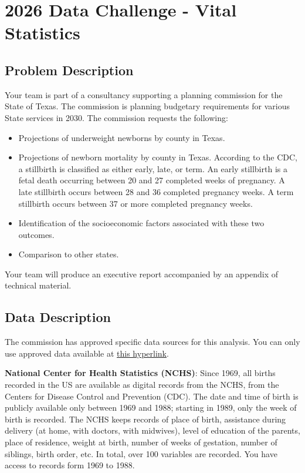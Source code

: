 
\chapter{2026 Data Challenge - Vital Statistics}  \newpage

\section{Problem Description}\label{sec:Problem}
Your team is part of a consultancy supporting a planning commission for the State of Texas.  The commission is planning budgetary requirements for various State services in 2030.  The commission requests the following:
\begin{itemize}
	\item Projections of underweight newborns by county in Texas.
	\item Projections of newborn mortality by county in Texas. According to the CDC, a stillbirth is classified as either early, late, or term. An early stillbirth is a fetal death occurring between 20 and 27 completed weeks of pregnancy. A late stillbirth occurs between 28 and 36 completed pregnancy weeks. A term stillbirth occurs between 37 or more completed pregnancy weeks.
	\item Identification of the socioeconomic factors associated with these two outcomes.
	\item Comparison to other states.
\end{itemize}

Your team will produce an executive report accompanied by an appendix of technical material.

\section{Data Description}
The commission has approved specific data sources for this analysis. You can only use approved data available at \href{https://drive.google.com/drive/folders/1oq2yuKgBPOAp4wwRngMAI5b_tvVDlNvm}{this hyperlink}.

\textbf{National Center for Health Statistics (NCHS)}: Since 1969, all births recorded in the US are available as digital records from the NCHS, from the Centers for Disease Control and Prevention (CDC). The date and time of birth is publicly available only between 1969 and 1988; starting in 1989, only the week of birth is recorded. %
The NCHS keeps records of place of birth, assistance during delivery (at home, with doctors, with midwives), level of education of the parents, place of residence, weight at birth, number of weeks of gestation, number of siblings, birth order, etc. In total, over 100 variables are recorded. You have access to records form 1969 to 1988.

